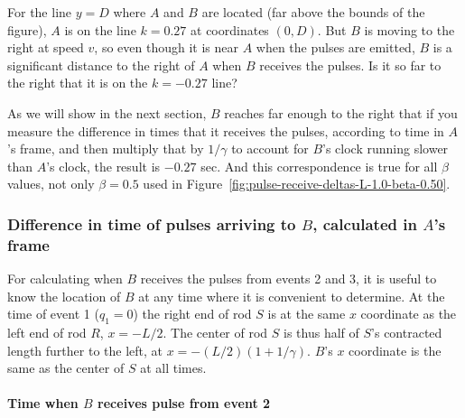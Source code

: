\documentclass[a4paper]{article}
\theoremstyle{plain}
\theoremstyle{definition}
\begin{document}
For the line $y=D$ where $A$ and $B$ are located (far above the bounds
of the figure), $A$ is on the line $k=0.27$ at coordinates $(0, D)$.
But $B$ is moving to the right at speed $v$, so even though it is near
$A$ when the pulses are emitted, $B$ is a significant distance to the
right of $A$ when $B$ receives the pulses.  Is it so far to the right
that it is on the $k=-0.27$ line?

As we will show in the next section, $B$ reaches far enough to the
right that if you measure the difference in times that it receives the
pulses, according to time in $A$'s frame, and then multiply that by
$1/\gamma$ to account for $B$'s clock running slower than $A$'s clock,
the result is $-0.27$ sec.  And this correspondence is true for all
$\beta$ values, not only $\beta=0.5$ used in
Figure~\ref{fig:pulse-receive-deltas-L-1.0-beta-0.50}.


\subsubsection{Difference in time of pulses arriving to $B$, calculated in $A$'s frame}
\label{sec:scen3-Breceivepulsetimes}


For calculating when $B$ receives the pulses from events 2 and 3, it
is useful to know the location of $B$ at any time where it is
convenient to determine.  At the time of event 1 ($q_1=0$) the right
end of rod $S$ is at the same $x$ coordinate as the left end of rod
$R$, $x=-L/2$.  The center of rod $S$ is thus half of $S$'s contracted
length further to the left, at $x=-(L/2)(1+1/\gamma)$.  $B$'s $x$
coordinate is the same as the center of $S$ at all times.

\paragraph{Time when $B$ receives pulse from event 2}
\end{document}

